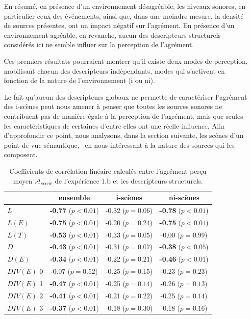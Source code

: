 En résumé, en présence d'un environnement désagréable, les niveaux sonores, en particulier ceux des événements, ainsi que, dans une moindre mesure, la densité de sources présentes, ont un impact négatif sur l'agrément. En présence d'un environnement agréable, en revanche, aucun des descripteurs structurels considérés ici ne semble influer sur la perception de l'agrément. 

Ces premiers résultats pourraient montrer qu'il existe deux modes de perception, mobilisant chacun des descripteurs indépendants, modes qui s'activent en fonction de la nature de l'environnement (i ou ni).

Le fait qu'aucun des descripteurs globaux ne permette de caractériser l'agrément des i-scènes peut nous amener à penser que toutes les sources sonores ne contribuent pas de manière égale à la perception de l'agrément, mais que seules les caractéristiques de certaines d'entre elles ont une réelle influence. Afin d'approfondir ce point, nous analysons, dans la section suivante, les scènes d'un point de vue sémantique, \ie~en nous intéressant à la nature des sources qui les composent. \\


\begin{table}[t]
\centering
\begin{tabular}{l c c c} 
               & ensemble                     & i-scènes                   & ni-scènes    \\
\hline
$L$            & \textbf{-0.77} ($p<0.01$)    & -0.32 ($p=0.06$)           & \textbf{-0.78} ($p<0.01$)\\
$L(E)$         & \textbf{-0.75} ($p<0.01$)    & -0.20 ($p=0.24$)           & \textbf{-0.75} ($p<0.01$)\\
$L(T)$         & \textbf{-0.53} ($p<0.01$)    & -0.33 ($p=0.05$)           &  -0.00 ($p=0.99$) \\
$D$            & \textbf{-0.43} ($p<0.01$)    & -0.31 ($p=0.07$)           & \textbf{-0.38} ($p<0.05$)\\
$D(E)$         & \textbf{-0.34} ($p<0.01$)    & -0.22 ($p=0.21$)           & \textbf{-0.46} ($p<0.01$)\\
$DIV(E)$ 0     &          -0.07 ($p=0.52$)    & -0.25 ($p=0.15$)           & -0.23 ($p=0.23$)\\
$DIV(E)$ 1     & \textbf{-0.47} ($p<0.01$)    & -0.25 ($p=0.14$)           & -0.26 ($p=0.13$)\\
$DIV(E)$ 2     & \textbf{-0.41} ($p<0.01$)    & -0.21 ($p=0.22$)           & -0.25 ($p=0.14$)\\
$DIV(E)$ 3     & \textbf{-0.37} ($p<0.01$)    & -0.18 ($p=0.30$)           & -0.18 ($p=0.16$)\\
\hline
\end{tabular}
\vspace{0.5mm}
\caption{Coefficients de corrélation linéaire calculés entre l'agrément perçu moyen $\mathcal{A}_{scene}$ de l'expérience 1.b et les descripteurs structurels.}
\label{tab:corrStructA}
\end{table}


